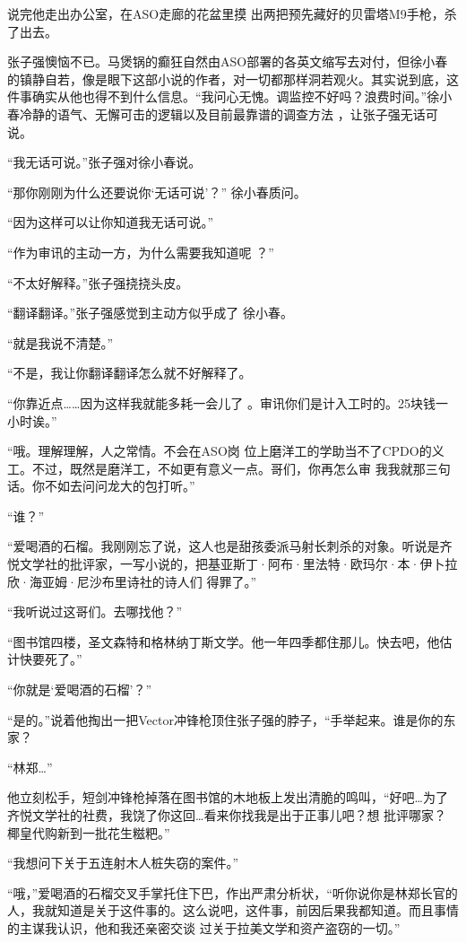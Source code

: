 \documentclass{article}
\begin{document}
说完他走出办公室，在ASO走廊的花盆里摸
出两把预先藏好的贝雷塔M9手枪，杀了出去。 

张子强懊恼不已。马煲锅的癫狂自然由ASO部署的各英文缩写去对付，但徐小春的镇静自若，像是眼下这部小说的作者，对一切都那样洞若观火。其实说到底，这件事确实从他也得不到什么信息。“我问心无愧。调监控不好吗？浪费时间。”徐小春冷静的语气、无懈可击的逻辑以及目前最靠谱的调查方法
，让张子强无话可说。 


“我无话可说。”张子强对徐小春说。 

\newpage

“那你刚刚为什么还要说你‘无话可说’？”
徐小春质问。 


“因为这样可以让你知道我无话可说。” 

“作为审讯的主动一方，为什么需要我知道呢
？” 


“不太好解释。”张子强挠挠头皮。 

“翻译翻译。”张子强感觉到主动方似乎成了
徐小春。 


“就是我说不清楚。” 

“不是，我让你翻译翻译怎么就不好解释了。

“你靠近点……因为这样我就能多耗一会儿了
。审讯你们是计入工时的。25块钱一小时诶。” 

“哦。理解理解，人之常情。不会在ASO岗
\newpage
位上磨洋工的学助当不了CPDO的义工。不过，既然是磨洋工，不如更有意义一点。哥们，你再怎么审
我我就那三句话。你不如去问问龙大的包打听。” 


“谁？” 

“爱喝酒的石榴。我刚刚忘了说，这人也是甜孩委派马射长刺杀的对象。听说是齐悦文学社的批评家，一写小说的，把基亚斯丁·阿布·里法特·欧玛尔·本·伊卜拉欣·海亚姆·尼沙布里诗社的诗人们
得罪了。” 


“我听说过这哥们。去哪找他？” 

“图书馆四楼，圣文森特和格林纳丁斯文学。他一年四季都住那儿。快去吧，他估计快要死了。”


“你就是‘爱喝酒的石榴’？” 

“是的。”说着他掏出一把Vector冲锋枪顶住张子强的脖子，“手举起来。谁是你的东家？
\newpage



“林郑…” 

他立刻松手，短剑冲锋枪掉落在图书馆的木地板上发出清脆的鸣叫，“好吧…为了齐悦文学社的社费，我饶了你这回…看来你找我是出于正事儿吧？想
批评哪家？椰皇代购新到一批花生糍粑。” 

“我想问下关于五连射木人桩失窃的案件。”

“哦，”爱喝酒的石榴交叉手掌托住下巴，作出严肃分析状，“听你说你是林郑长官的人，我就知道是关于这件事的。这么说吧，这件事，前因后果我都知道。而且事情的主谋我认识，他和我还亲密交谈
过关于拉美文学和资产盗窃的一切。” 
\end{document}
